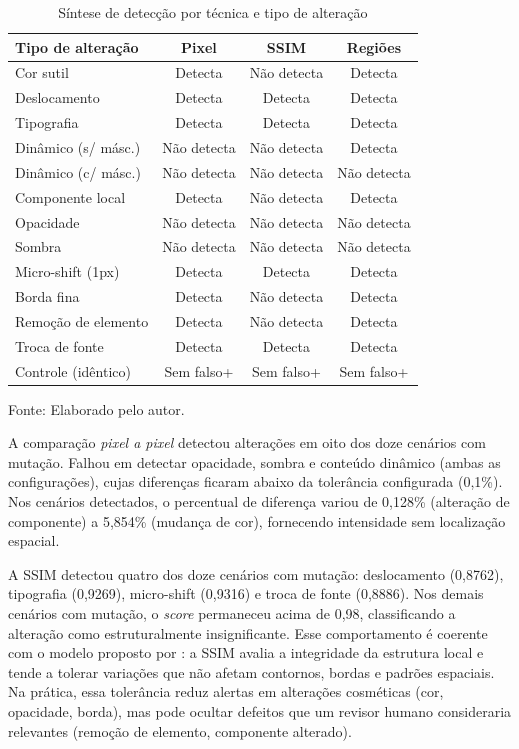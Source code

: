 \documentclass{UNESC}
\begin{document}
\begin{table}[H]
\centering
\caption{Síntese de detecção por técnica e tipo de alteração}
\label{tab:sintese}
\small
\setlength{\tabcolsep}{5pt}
\renewcommand{\arraystretch}{1.2}
\begin{tabular}{|l|c|c|c|}
\hline
\textbf{Tipo de alteração} & \textbf{Pixel} & \textbf{SSIM} & \textbf{Regiões} \\
\hline
Cor sutil          & Detecta & Não detecta & Detecta \\
Deslocamento       & Detecta & Detecta     & Detecta \\
Tipografia         & Detecta & Detecta     & Detecta \\
Dinâmico (s/ másc.)& Não detecta & Não detecta & Detecta \\
Dinâmico (c/ másc.)& Não detecta & Não detecta & Não detecta \\
Componente local   & Detecta & Não detecta & Detecta \\
Opacidade          & Não detecta & Não detecta & Não detecta \\
Sombra             & Não detecta & Não detecta & Não detecta \\
Micro-shift (1px)  & Detecta & Detecta     & Detecta \\
Borda fina         & Detecta & Não detecta & Detecta \\
Remoção de elemento& Detecta & Não detecta & Detecta \\
Troca de fonte     & Detecta & Detecta     & Detecta \\
Controle (idêntico)& Sem falso+ & Sem falso+ & Sem falso+ \\
\hline
\end{tabular}
\vspace{-0.2cm}
\hspace{1cm}\footnotesize Fonte: Elaborado pelo autor.
\end{table}

A comparação \emph{pixel a pixel} detectou alterações em oito dos doze cenários com mutação. Falhou em detectar opacidade, sombra e conteúdo dinâmico (ambas as configurações), cujas diferenças ficaram abaixo da tolerância configurada (0,1\%). Nos cenários detectados, o percentual de diferença variou de 0,128\% (alteração de componente) a 5,854\% (mudança de cor), fornecendo intensidade sem localização espacial.

A SSIM detectou quatro dos doze cenários com mutação: deslocamento (0,8762), tipografia (0,9269), micro-shift (0,9316) e troca de fonte (0,8886). Nos demais cenários com mutação, o \emph{score} permaneceu acima de 0,98, classificando a alteração como estruturalmente insignificante. Esse comportamento é coerente com o modelo proposto por : a SSIM avalia a integridade da estrutura local e tende a tolerar variações que não afetam contornos, bordas e padrões espaciais. Na prática, essa tolerância reduz alertas em alterações cosméticas (cor, opacidade, borda), mas pode ocultar defeitos que um revisor humano consideraria relevantes (remoção de elemento, componente alterado).
\end{document}
